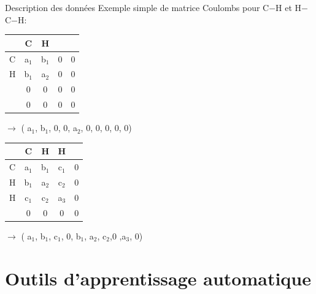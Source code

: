 \documentclass{beamer}
\begin{document}
\begin{frame}{Description des données}
Exemple simple de matrice Coulombs pour C$-$H et H$-$C$-$H:
\\
\begin{tabular}{ l | c c c c }
	 & C 	& H 	&   &		\\
	 \hline
   C & a$_1$ & b$_1$ &  0 & 0   \\
   H & b$_1$ & a$_2$ &	0 & 0	\\
    & 0 & 0 & 0 & 0	 \\
   & 0 & 0 & 0 & 0 \\
    \end{tabular} $\rightarrow$ ( a$_1$, b$_1$, 0, 0, a$_2$, 0, 0, 0, 0, 0)
  \newline
\begin{tabular}{ l | c c c c }
	 & C 	& H 	& H  &		\\
	 \hline
   C & a$_1$ & b$_1$ &  c$_1$ & 0   \\
   H & b$_1$ & a$_2$ &	c$_2$ & 0	\\
   H & c$_1$ & c$_2$ &	a$_3$ & 0	\\
   & 0 & 0 & 0 & 0 \\
    \end{tabular}  $\rightarrow$ ( a$_1$, b$_1$, c$_1$, 0, b$_1$, a$_2$, c$_2$,0 ,a$_3$, 0)
\end{frame}
\section{Outils d'apprentissage automatique}
\end{document}
